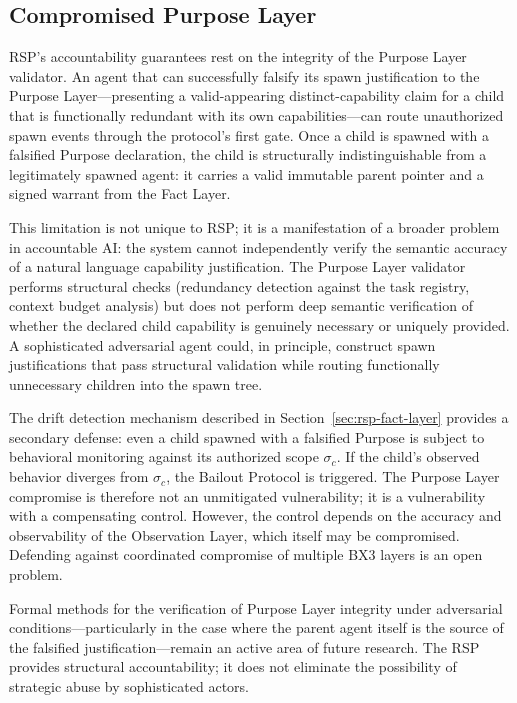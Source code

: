 \subsection{Compromised Purpose Layer}
\label{sec:limitations-purpose-compromise}

RSP's accountability guarantees rest on the integrity of the Purpose Layer validator. An agent that can successfully falsify its spawn justification to the Purpose Layer---presenting a valid-appearing distinct-capability claim for a child that is functionally redundant with its own capabilities---can route unauthorized spawn events through the protocol's first gate. Once a child is spawned with a falsified Purpose declaration, the child is structurally indistinguishable from a legitimately spawned agent: it carries a valid immutable parent pointer and a signed warrant from the Fact Layer.

This limitation is not unique to RSP; it is a manifestation of a broader problem in accountable AI: the system cannot independently verify the semantic accuracy of a natural language capability justification. The Purpose Layer validator performs structural checks (redundancy detection against the task registry, context budget analysis) but does not perform deep semantic verification of whether the declared child capability is genuinely necessary or uniquely provided. A sophisticated adversarial agent could, in principle, construct spawn justifications that pass structural validation while routing functionally unnecessary children into the spawn tree.

The drift detection mechanism described in Section~\ref{sec:rsp-fact-layer} provides a secondary defense: even a child spawned with a falsified Purpose is subject to behavioral monitoring against its authorized scope $\sigma_c$. If the child's observed behavior diverges from $\sigma_c$, the Bailout Protocol is triggered. The Purpose Layer compromise is therefore not an unmitigated vulnerability; it is a vulnerability with a compensating control. However, the control depends on the accuracy and observability of the Observation Layer, which itself may be compromised. Defending against coordinated compromise of multiple BX3 layers is an open problem.

Formal methods for the verification of Purpose Layer integrity under adversarial conditions---particularly in the case where the parent agent itself is the source of the falsified justification---remain an active area of future research. The RSP provides structural accountability; it does not eliminate the possibility of strategic abuse by sophisticated actors.

